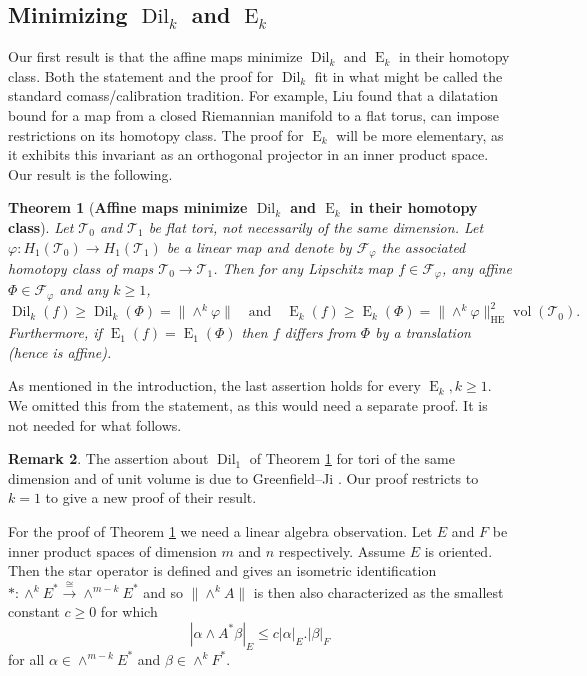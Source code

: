 \documentclass[11pt,letterpaper]{amsart}
\newtheorem{theorem}{Theorem}[section]
\theoremstyle{definition}
\numberwithin{equation}{section}
\theoremstyle{definition}
\newtheorem{remark}[theorem]{Remark}
\newcommand{\Fc}{\mathcal{F}}
\newcommand{\Tc}{\mathcal{T}}
\DeclareMathOperator{\En}{E}
\DeclareMathOperator{\HE}{HE}
\newcommand{\Dil}{\operatorname{Dil}}
\newcommand{\vol}{\operatorname{vol}}
\begin{document}
\subsection{Minimizing \boldmath$\Dil_k$ and $ \En_k$} Our first result is that the affine maps minimize $\Dil_k$ and $ \En_k$ in their homotopy class.  Both the statement and the proof for $\Dil_k$  fit in what might be called the  standard comass/calibration tradition. For example,  %
Liu \cite[Thm.\ 2.1]{Liu12} found that a dilatation bound for a map from a closed Riemannian manifold to a flat torus, can impose restrictions on its homotopy class.  The proof for $\En_k$ will be more elementary, as  it exhibits this invariant as an orthogonal projector in an inner product space. Our result is the following.

\begin{theorem}[{\bf Affine maps minimize $\Dil_k$ and $\En_k$ in their homotopy class}]
\label{thm:extremal}
Let $\Tc_0$ and $\Tc_1$ be flat  tori, not necessarily of the same dimension.  Let $\varphi: H_1(\Tc_0)\to H_1(\Tc_1)$ be a linear map and denote 
by $\Fc_\varphi$ the associated homotopy class of maps $\Tc_0\to \Tc_1$.
Then for any Lipschitz map 
$f\in \Fc_\varphi$, any affine $\Phi\in \Fc_\varphi$ and any $k\ge 1$, 
\[\Dil_k(f)\geq \Dil_k(\Phi)=\|\wedge^k\varphi\| \quad \text{and}\quad \En_k(f)\ge  \En_k(\Phi)=\|\wedge^k\varphi\|_{\HE}^2\vol(\Tc_0).
\]
Furthermore, if $\En_1(f)= \En_1(\Phi)$ then $f$ differs from $\Phi$ by a translation (hence is affine).
\end{theorem}

As mentioned in the introduction, the last assertion holds for every $\En_k, k\geq 1$. We omitted this from the statement, as this would need a separate proof. It is not needed for what follows.


\begin{remark}
The assertion about $\Dil_1$ of Theorem \ref{thm:extremal} for tori of the same dimension and of unit volume  is due to Greenfield--Ji \cite[Proposition~4.1]{GreenfieldJi21}.  Our proof restricts to $k=1$ to give a new proof of their result. 
\end{remark}


For the proof of Theorem \ref{thm:extremal} we need a linear algebra observation.  Let $E$ and $F$ be inner product spaces of dimension $m$ and $n$ respectively. Assume $E$ is oriented.  Then the star operator is defined and gives an 
isometric identification $*: \wedge^kE^\ast\xrightarrow{\cong}\wedge^{m-k}E^\ast$ and so 
$\|\wedge^k A\|$ is then also characterized as the smallest constant $c\ge 0$ for which 
\begin{equation}\label{eqn:}
|\alpha\wedge A^*\beta |_E\le c|\alpha|_E.|\beta|_F
\end{equation}
for all $\alpha\in \wedge^{m-k}E^*$ and $\beta\in \wedge^{k}F^*$.
\end{document}
